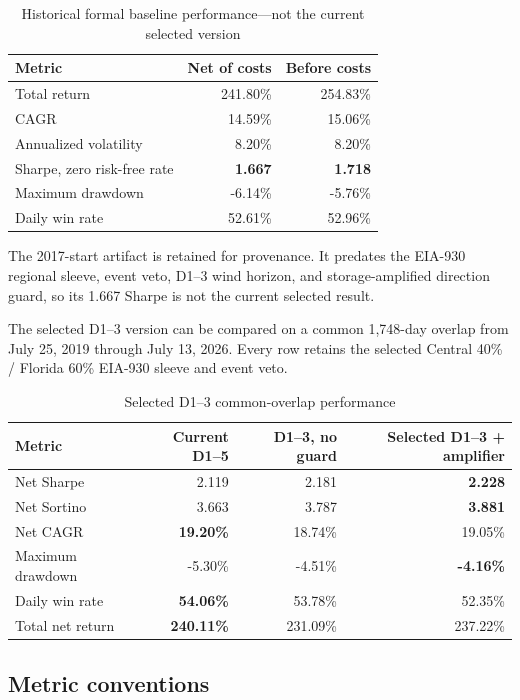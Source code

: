\documentclass[11pt,a4paper]{article}
\begin{document}
\begin{table}[h]
\centering
\caption{Historical formal baseline performance---not the current selected version}
\begin{tabular}{lrr}
\toprule
Metric & Net of costs & Before costs\\
\midrule
Total return & 241.80\% & 254.83\%\\
CAGR & 14.59\% & 15.06\%\\
Annualized volatility & 8.20\% & 8.20\%\\
Sharpe, zero risk-free rate & \textbf{1.667} & \textbf{1.718}\\
Maximum drawdown & -6.14\% & -5.76\%\\
Daily win rate & 52.61\% & 52.96\%\\
\bottomrule
\end{tabular}
\end{table}

The 2017-start artifact is retained for provenance. It predates the EIA-930
regional sleeve, event veto, D1--3 wind horizon, and storage-amplified
direction guard, so its 1.667 Sharpe is not the current selected result.

The selected D1--3 version can be compared on a common 1,748-day overlap from
July 25, 2019 through July 13, 2026. Every row retains the selected Central
40\% / Florida 60\% EIA-930 sleeve and event veto.

\begin{table}[h]
\centering
\caption{Selected D1--3 common-overlap performance}
\begin{tabular}{lrrr}
\toprule
Metric & Current D1--5 & D1--3, no guard & Selected D1--3 + amplifier\\
\midrule
Net Sharpe & 2.119 & 2.181 & \textbf{2.228}\\
Net Sortino & 3.663 & 3.787 & \textbf{3.881}\\
Net CAGR & \textbf{19.20\%} & 18.74\% & 19.05\%\\
Maximum drawdown & -5.30\% & -4.51\% & \textbf{-4.16\%}\\
Daily win rate & \textbf{54.06\%} & 53.78\% & 52.35\%\\
Total net return & \textbf{240.11\%} & 231.09\% & 237.22\%\\
\bottomrule
\end{tabular}
\end{table}

\subsection*{Metric conventions}
\end{document}
